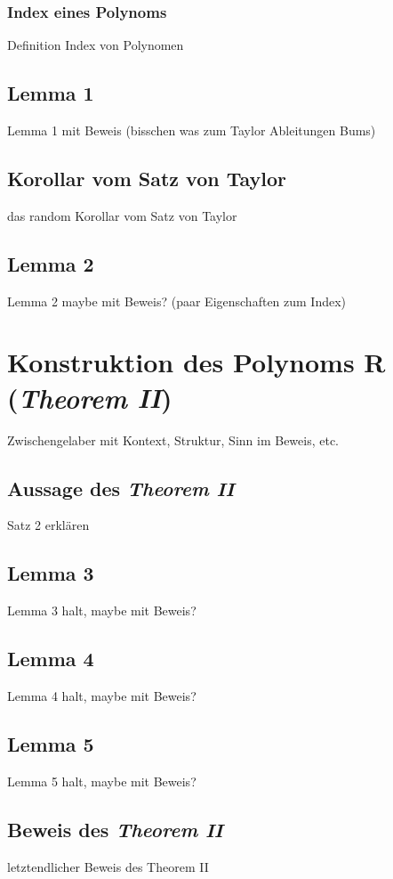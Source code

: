 \documentclass[11pt]{article}
\begin{document}
            \subsubsection{Index eines Polynoms}
            \label{subsubsec:index-poly}
                Definition Index von Polynomen
            
        \subsection{Lemma 1}
        \label{subsec:lemma1}
            Lemma 1 mit Beweis (bisschen was zum Taylor Ableitungen Bums)
        
        \subsection{Korollar vom Satz von Taylor}
        \label{subsec:taylor-corollary}
            das random Korollar vom Satz von Taylor
        
        \subsection{Lemma 2}
        \label{subsec:lemma2}
            Lemma 2 maybe mit Beweis? (paar Eigenschaften zum Index)

    \section{Konstruktion des Polynoms R (\emph{Theorem II})}
    \label{sec:th2}
        Zwischengelaber mit Kontext, Struktur, Sinn im Beweis, etc.

        \subsection{Aussage des \emph{Theorem II}}
        \label{subsec:th2}
            \textrm{Satz 2 erklären}

        \subsection{Lemma 3}
        \label{subsec:lemma3}
            Lemma 3 halt, maybe mit Beweis?

        \subsection{Lemma 4}
        \label{subsec:lemma4}
            Lemma 4 halt, maybe mit Beweis?

        \subsection{Lemma 5}
        \label{subsec:lemma5}
            Lemma 5 halt, maybe mit Beweis?

        \subsection{Beweis des \emph{Theorem II}}
        \label{subsec:proof-th-2}
            letztendlicher Beweis des Theorem II
        
\end{document}
